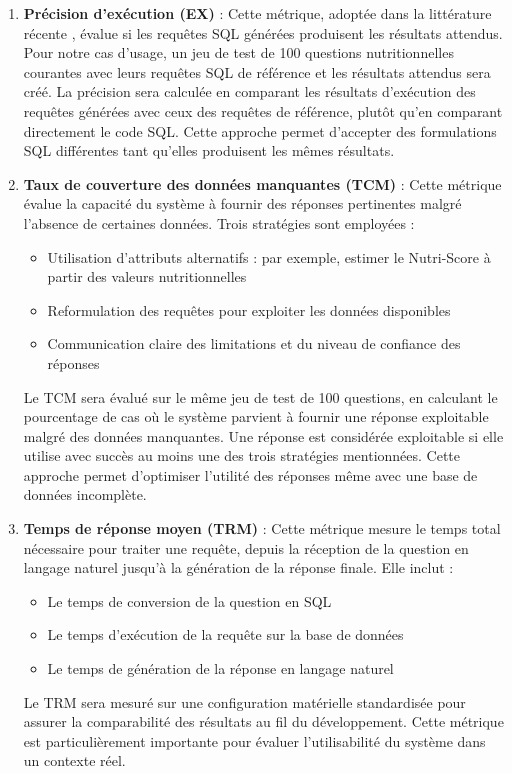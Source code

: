 \documentclass[a4paper,11pt]{article}
\begin{document}
\begin{enumerate}
   \item \textbf{Précision d'exécution (EX)} : Cette métrique, adoptée dans la littérature récente \citep{li2024can}, 
évalue si les requêtes SQL générées produisent les résultats attendus. Pour notre cas d'usage, un jeu 
de test de 100 questions nutritionnelles courantes avec leurs requêtes SQL de référence et les résultats attendus sera créé. 
La précision 
sera calculée en comparant les résultats d'exécution des requêtes générées avec ceux des requêtes de référence, plutôt 
qu'en comparant directement le code SQL. Cette approche permet d'accepter des formulations SQL différentes tant qu'elles 
produisent les mêmes résultats.

   \item \textbf{Taux de couverture des données manquantes (TCM)} : Cette métrique évalue la capacité du système à fournir des réponses pertinentes malgré l'absence de certaines données. Trois stratégies sont employées :
   \begin{itemize}
       \item Utilisation d'attributs alternatifs : par exemple, estimer le Nutri-Score à partir des valeurs nutritionnelles
       \item Reformulation des requêtes pour exploiter les données disponibles
       \item Communication claire des limitations et du niveau de confiance des réponses
   \end{itemize}
   Le TCM sera évalué sur le même jeu de test de 100 questions, en calculant le pourcentage de cas où le système parvient 
   à fournir une réponse exploitable malgré des données manquantes. Une réponse est considérée exploitable si elle utilise 
   avec succès au moins une des trois stratégies mentionnées. Cette approche permet d'optimiser l'utilité des réponses 
   même avec une base de données incomplète.

   \item \textbf{Temps de réponse moyen (TRM)} : Cette métrique mesure le temps total nécessaire pour traiter une requête, depuis la réception de la question en langage naturel jusqu'à la génération de la réponse finale. Elle inclut :
   \begin{itemize}
       \item Le temps de conversion de la question en SQL
       \item Le temps d'exécution de la requête sur la base de données
       \item Le temps de génération de la réponse en langage naturel
   \end{itemize}
   Le TRM sera mesuré sur une configuration matérielle standardisée pour assurer la comparabilité des résultats au fil 
   du développement. Cette métrique est particulièrement importante pour évaluer l'utilisabilité du système dans un 
   contexte réel.
\end{enumerate}
\end{document}
